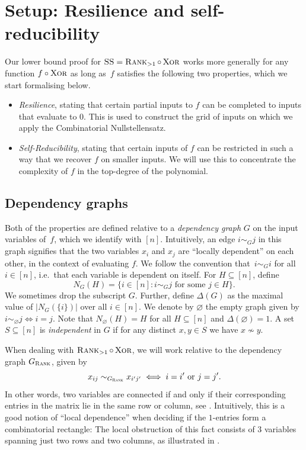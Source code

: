 \documentclass{article}
\begin{document}
\section{Setup: Resilience and self-reducibility}
Our lower bound proof for $\operatorname{\textsc{SS}}=\operatorname{\textsc{Rank}}_{>1}\circ\operatorname{\textsc{Xor}}$ works more generally for any function $f\circ \operatorname{\textsc{Xor}}$ as long as~$f$ satisfies the following two properties, which we start formalising below.
\begin{itemize}[label=$-$,itemsep=0em]
    \item \emph{Resilience}, stating that certain partial inputs to $f$ can be completed to inputs that evaluate to $0$. This is used to construct the grid of inputs on which we apply the Combinatorial Nullstellensatz.
    \item \emph{Self-Reducibility}, stating that certain inputs of $f$ can be restricted in such a way that we recover $f$ on smaller inputs. We will use this to concentrate the complexity of $f$ in the top-degree of the polynomial.
\end{itemize}

\label{sec:proof-defs}

\subsection{Dependency graphs}
Both of the properties are defined relative to a \emph{dependency graph} $G$ on the input variables of~$f$, which we identify with $[n]$. Intuitively, an edge $i\sim_G j$ in this graph signifies that the two variables $x_i$ and $x_j$ are ``locally dependent'' on each other, in the context of evaluating $f$. We follow the convention that~$i \sim_G i$ for all $i\in [n]$, i.e.\ that each variable is dependent on itself. For $H \subseteq [n]$, define
\[
    N_G(H) = \{i\in [n]: i\sim_G j \text{ for some } j\in H \}.
\]
We sometimes drop the subscript $G$. Further, define $\Delta(G)$ as the maximal value of $|N_G(\{i\})|$ over all $i\in[n]$. We denote by $\varnothing$ the empty graph given by $i\sim_\varnothing j \iff i = j$. Note that $N_\varnothing(H) = H$ for all $H\subseteq [n]$ and $\Delta(\varnothing) = 1$. A set $S\subseteq [n]$ is \emph{independent} in $G$ if for any distinct $x,y\in S$ we have $x\not\sim y$.

When dealing with $\operatorname{\textsc{Rank}}_{>1}\circ\operatorname{\textsc{Xor}}$, we will work relative to the dependency graph $G_{\operatorname{\textsc{Rank}}}$, given by
\[
    x_{ij} \sim_{G_{\operatorname{\textsc{Rank}}}} x_{i'j'} \iff i = i' \text{ or } j = j'.
\]
In other words, two variables are connected if and only if their corresponding entries in the matrix lie in the same row or column, see .
Intuitively, this is a good notion of ``local dependence'' when deciding if the $1$-entries form a combinatorial rectangle: The local obstruction of this fact consists of $3$ variables spanning just two rows and two columns, as illustrated in . 
\end{document}

